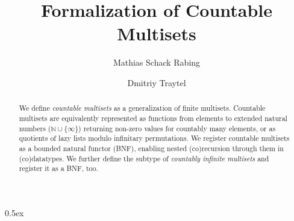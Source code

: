 \documentclass[11pt,a4paper]{article}
\title{Formalization of Countable Multisets}
\author{Mathias Schack Rabing \and Dmitriy Traytel}
\begin{document}
\maketitle

\begin{abstract}
  We define \emph{countable multisets} as a generalization of finite multisets.
  Countable multisets are equivalently represented as functions from elements to extended natural numbers
  ($\mathbb{N} \cup \{\infty\}$) returning non-zero values for countably many elements,
  or as quotients of lazy lists modulo infinitary permutations.
  We register countable multisets as a bounded natural functor (BNF), enabling nested (co)recursion through them
  in (co)datatypes. We further define the subtype of
  \emph{countably infinite multisets} and register it as a BNF, too.
\end{abstract}

\tableofcontents

\newpage
\parindent 0pt\parskip 0.5ex


\end{document}
